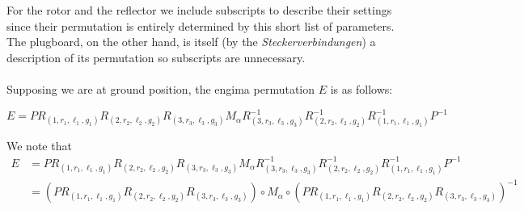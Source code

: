 For the rotor and the reflector we include subscripts to describe their settings since their permutation is entirely determined by this short list of parameters.
The plugboard, on the other hand, is itself (by the \emph{Steckerverbindungen}) a description of its permutation so subscripts are unnecessary.
\\\\Supposing we are at ground position, the engima permutation $E$ is as follows:
\begin{center}
    $E = PR_{(1,r_1, \ell_1, g_1)}R_{(2, r_2, \ell_2, g_2)}R_{(3, r_3, \ell_3, g_3)}M_\alpha R_{(3, r_3, \ell_3, g_3)}^{-1} R_{(2, r_2, \ell_2, g_2)}^{-1} R_{(1,r_1, \ell_1, g_1)}^{-1} P^{-1}$
\end{center}
\noindent We note that
\begin{align*}
    E &= PR_{(1,r_1, \ell_1, g_1)}R_{(2, r_2, \ell_2, g_2)}R_{(3, r_3, \ell_3, g_3)}M_\alpha R_{(3, r_3, \ell_3, g_3)}^{-1} R_{(2, r_2, \ell_2, g_2)}^{-1} R_{(1,r_1, \ell_1, g_1)}^{-1} P^{-1}
    \\&=(PR_{(1,r_1, \ell_1, g_1)}R_{(2, r_2, \ell_2, g_2)}R_{(3, r_3, \ell_3, g_3)})\circ M_\alpha \circ(PR_{(1,r_1, \ell_1, g_1)}R_{(2, r_2, \ell_2, g_2)}R_{(3, r_3, \ell_3, g_3)})^{-1}
\end{align*}